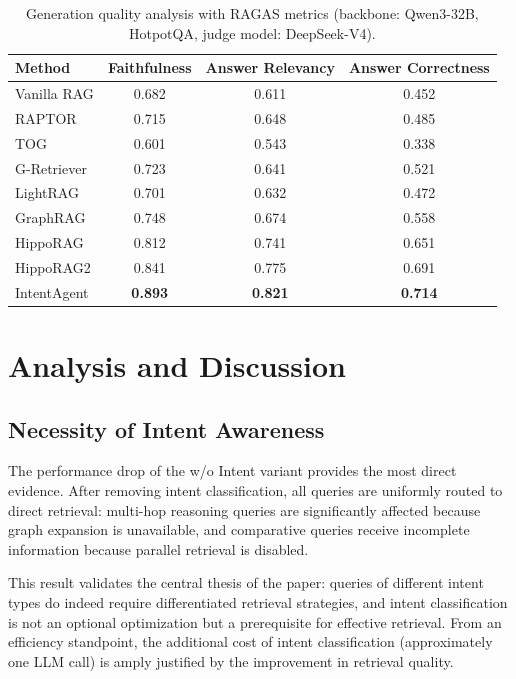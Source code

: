 \documentclass[runningheads]{llncs}
\begin{document}
\begin{table}[htbp]
\centering
\caption{Generation quality analysis with RAGAS metrics (backbone: Qwen3-32B, HotpotQA, judge model: DeepSeek-V4).}
\label{tab:ragas}
\begin{tabular}{l|ccc}
\toprule
\textbf{Method} & \textbf{Faithfulness} & \textbf{Answer Relevancy} & \textbf{Answer Correctness} \\
\midrule
Vanilla RAG & 0.682 & 0.611 & 0.452 \\
RAPTOR & 0.715 & 0.648 & 0.485 \\
TOG & 0.601 & 0.543 & 0.338 \\
G-Retriever & 0.723 & 0.641 & 0.521 \\
LightRAG & 0.701 & 0.632 & 0.472 \\
GraphRAG & 0.748 & 0.674 & 0.558 \\
HippoRAG & 0.812 & 0.741 & 0.651 \\
HippoRAG2 & 0.841 & 0.775 & 0.691 \\
\midrule
IntentAgent & \textbf{0.893} & \textbf{0.821} & \textbf{0.714} \\
\bottomrule
\end{tabular}
\end{table}

\section{Analysis and Discussion}

\subsection{Necessity of Intent Awareness}

The performance drop of the w/o Intent variant provides the most direct evidence. After removing intent classification, all queries are uniformly routed to direct retrieval: multi-hop reasoning queries are significantly affected because graph expansion is unavailable, and comparative queries receive incomplete information because parallel retrieval is disabled.

This result validates the central thesis of the paper: queries of different intent types do indeed require differentiated retrieval strategies, and intent classification is not an optional optimization but a prerequisite for effective retrieval. From an efficiency standpoint, the additional cost of intent classification (approximately one LLM call) is amply justified by the improvement in retrieval quality.
\end{document}
